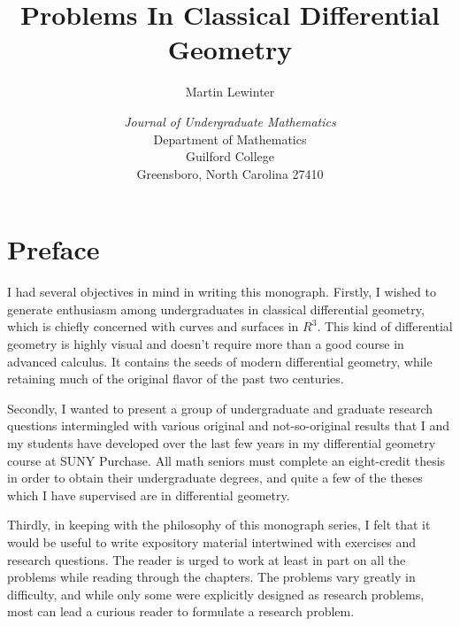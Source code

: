 \documentclass{book}
\let\titlepageAuthor\author
\renewcommand{\author}[1]{\newcommand{\headerAuthor}{#1}\titlepageAuthor{#1}}
\let\titlepageTitle\title
\renewcommand{\title}[1]{\newcommand{\headerTitle}{#1}\titlepageTitle{#1}}
\begin{document}

\thispagestyle{empty}
\title{Problems In Classical Differential Geometry}
\author{Martin Lewinter}
\date{\vspace{3cm}
  \emph{Journal of Undergraduate Mathematics}\\
  Department of Mathematics\\
  Guilford College\\
  Greensboro, North Carolina 27410
  }
\maketitle


\thispagestyle{empty}
\setcounter{tocdepth}{3} 
\tableofcontents
\thispagestyle{empty}



\chapter*{Preface}


\setcounter{equation}{0}

I had several objectives in mind in writing this monograph. Firstly, I wished to generate enthusiasm among undergraduates in classical differential geometry, which is chiefly concerned with curves and surfaces in $R^{3}$. This kind of differential geometry is highly visual and doesn't require more than a good course in advanced calculus. It contains the seeds of modern differential geometry, while retaining much of the original flavor of the past two centuries.

Secondly, I wanted to present a group of undergraduate and graduate research questions intermingled with various original and not-so-original results that I and my students have developed over the last few years in my differential geometry course at SUNY Purchase. All math seniors must complete an eight-credit thesis in order to obtain their undergraduate degrees, and quite a few of the theses which I have supervised are in differential geometry.

Thirdly, in keeping with the philosophy of this monograph series, I felt that it would be useful to write expository material intertwined with exercises and research questions. The reader is urged to work at least in part on all the problems while reading through the chapters. The problems vary greatly in difficulty, and while only some were explicitly designed as research problems, most can lead a curious reader to formulate a research problem.
\end{document}
